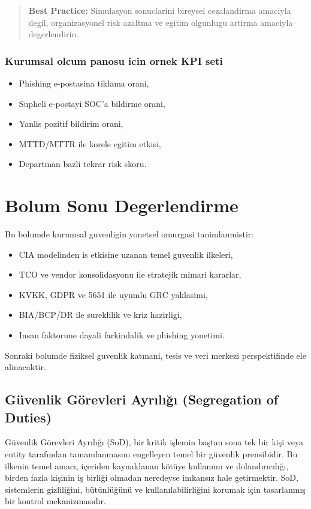 \begin{quote}
\textbf{Best Practice:} Simulasyon sonuclarini bireysel cezalandirma amaciyla degil,
organizasyonel risk azaltma ve egitim olgunlugu artirma amaciyla degerlendirin.
\end{quote}

\subsubsection{Kurumsal olcum panosu icin ornek KPI seti}
\begin{itemize}
    \item Phishing e-postasina tiklama orani,
    \item Supheli e-postayi SOC'a bildirme orani,
    \item Yanlis pozitif bildirim orani,
    \item MTTD/MTTR ile korele egitim etkisi,
    \item Departman bazli tekrar risk skoru.
\end{itemize}

\section*{Bolum Sonu Degerlendirme}
Bu bolumde kurumsal guvenligin yonetsel omurgasi tanimlanmistir:
\begin{itemize}
    \item CIA modelinden is etkisine uzanan temel guvenlik ilkeleri,
    \item TCO ve vendor konsolidasyonu ile stratejik mimari kararlar,
    \item KVKK, GDPR ve 5651 ile uyumlu GRC yaklasimi,
    \item BIA/BCP/DR ile sureklilik ve kriz hazirligi,
    \item Insan faktorune dayali farkindalik ve phishing yonetimi.
\end{itemize}

Sonraki bolumde fiziksel guvenlik katmani, tesis ve veri merkezi perspektifinde ele alinacaktir.

\subsection{Güvenlik Görevleri Ayrılığı (Segregation of Duties)}

Güvenlik Görevleri Ayrılığı (SoD), bir kritik işlemin baştan sona tek bir kişi veya entity tarafından tamamlanmasını engelleyen temel bir güvenlik prensibidir. Bu ilkenin temel amacı, içeriden kaynaklanan kötüye kullanımı ve dolandırıcılığı, birden fazla kişinin iş birliği olmadan neredeyse imkansız hale getirmektir. SoD, sistemlerin gizliliğini, bütünlüğünü ve kullanılabilirliğini korumak için tasarlanmış bir kontrol mekanizmasıdır.

